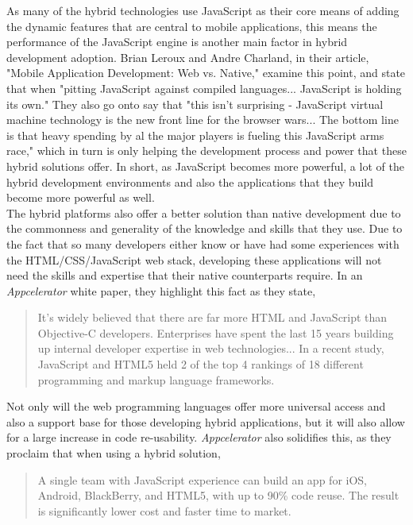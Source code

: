 \documentclass[11pt, twocolumn]{article}
\begin{document}
As many of the hybrid technologies use JavaScript as their core means of adding the dynamic features that are central to mobile applications, this means the performance of the JavaScript engine is another main factor in hybrid development adoption.  Brian Leroux and Andre Charland, in their article, "Mobile Application Development: Web vs. Native," examine this point, and state that when "pitting JavaScript against compiled languages... JavaScript is holding its own." They also go onto say that "this isn't surprising - JavaScript virtual machine technology is the new front line for the browser wars... The bottom line is that heavy spending by al the major players is fueling this JavaScript arms race," which in turn is only helping the development process and power that these hybrid solutions offer.  In short, as JavaScript becomes more powerful, a lot of the hybrid development environments and also the applications that they build become more powerful as well. ~\cite{Leroux2011} \\

The hybrid platforms also offer a better solution than native development due to the commonness and generality of the knowledge and skills that they use. Due to the fact that so many developers either know or have had some experiences with the HTML/CSS/JavaScript web stack, developing these applications will not need the skills and expertise that their native counterparts require.  In an {\it Appcelerator} white paper, they highlight this fact as they state,

\begin{quote}
It's widely believed that there are far more HTML and JavaScript than Objective-C developers.  Enterprises have spent the last 15 years building up internal developer expertise in web technologies... In a recent study, JavaScript and HTML5 held 2 of the top 4 rankings of 18 different programming and markup language frameworks. ~\cite{Appcelerator.com2012}
\end{quote}

Not only will the web programming languages offer more universal access and also a support base for those developing hybrid applications, but it will also allow for a large increase in code re-usability. {\it Appcelerator} also solidifies this, as they proclaim that when using a hybrid solution,\\

\begin{quote}
A single team with JavaScript experience can build an app for iOS, Android, BlackBerry, and HTML5, with up to 90\% code reuse.  The result is significantly lower cost and faster time to market. ~\cite{Appcelerator.com2012}
\end{quote}
\end{document}
